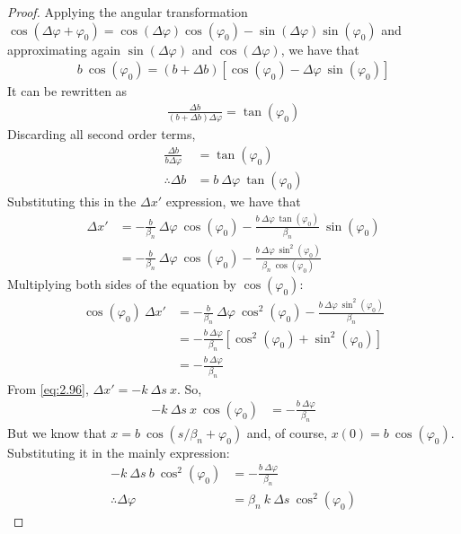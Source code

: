 \begin{proof}
	Applying the angular transformation $\cos(\Delta \varphi + \varphi_0) = \cos(\Delta \varphi)\cos(\varphi_0) - \sin(\Delta \varphi)\sin(\varphi_0)$ and approximating again $\sin(\Delta \varphi)$ and $\cos(\Delta \varphi)$, we have that
	\begin{align*}
		b\ \cos(\varphi_0) = (b+\Delta b)[\cos(\varphi_0)-\Delta \varphi\ \sin(\varphi_0)]
	\end{align*}
	It can be rewritten as
	\begin{align*}
		\frac{\Delta b}{(b+\Delta b)\Delta \varphi} = \tan(\varphi_0)
	\end{align*}
	Discarding all second order terms,
	\begin{align*}
		\frac{\Delta b}{b \Delta \varphi} &= \tan(\varphi_0)\\
		\therefore \Delta b &= b\ \Delta \varphi\ \tan(\varphi_0)
	\end{align*}
	Substituting this in the  $\Delta x'$ expression, we have that
	\begin{align*}
		\Delta x' &= -\frac{b}{\beta_n}\ \Delta \varphi\ \cos(\varphi_0) - \frac{b\ \Delta \varphi\ \tan(\varphi_0)}{\beta_n}\ \sin(\varphi_0)\\
				  &= -\frac{b}{\beta_n}\ \Delta \varphi\ \cos(\varphi_0) - \frac{b\ \Delta \varphi\ \sin^2(\varphi_0)}{\beta_n\ \cos(\varphi_0)}
	\end{align*}
	Multiplying both sides of the equation by $\cos(\varphi_0)$:
	\begin{align*}
		\cos(\varphi_0)\ \Delta x' &= -\frac{b}{\beta_n}\ \Delta \varphi\ \cos^2(\varphi_0) - \frac{b\ \Delta \varphi\ \sin^2(\varphi_0)}{\beta_n}\\
			&= -\frac{b\ \Delta \varphi}{\beta_n}[\cos^2(\varphi_0)+\sin^2(\varphi_0)]\\
			&= -\frac{b\ \Delta \varphi}{\beta_n}
	\end{align*}
	From \eqref{eq:2.96}, $\Delta x' = -k\ \Delta s\ x$. So,
	\begin{align*}
		-k\ \Delta s\ x\ \cos(\varphi_0) &= -\frac{b\ \Delta \varphi}{\beta_n}
	\end{align*}
	But we know that $x = b\ \cos(s/\beta_n + \varphi_0)$ and, of course, $x(0) = b\ \cos(\varphi_0)$. Substituting it in the mainly expression:
	\begin{align*}
		-k\ \Delta s\ b\ \cos^2(\varphi_0) &= -\frac{b\ \Delta \varphi}{\beta_n}\\
		\therefore \Delta \varphi &= \beta_n\ k\ \Delta s\ \cos^2(\varphi_0)
	\end{align*}

\end{proof}
